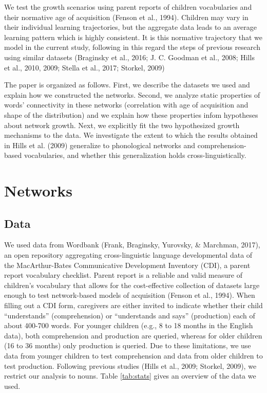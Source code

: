 \documentclass[english,floatsintext,man]{apa6}
\theoremstyle{definition}
\theoremstyle{definition}
\theoremstyle{definition}
\theoremstyle{remark}
\begin{document}
We test the growth scenarios using parent reports of children
vocabularies and their normative age of acquisition (Fenson et al.,
1994). Children may vary in their individual learning trajectories, but
the aggregate data leads to an average learning pattern which is highly
consistent. It is this normative trajectory that we model in the current
study, following in this regard the steps of previous research using
similar datasets (Braginsky et al., 2016; J. C. Goodman et al., 2008;
Hills et al., 2010, 2009; Stella et al., 2017; Storkel, 2009)

The paper is organized as follows. First, we describe the datasets we
used and explain how we constructed the networks. Second, we analyze
static properties of words' connectivity in these networks (correlation
with age of acquisition and shape of the distribution) and we explain
how these properties infom hypotheses about network growth. Next, we
explicitly fit the two hypothesized growth mechanisms to the data. We
investigate the extent to which the results obtained in Hills et al.
(2009) generalize to phonological networks and comprehension-based
vocabularies, and whether this generalization holds
cross-linguistically.

\section{Networks}\label{networks}

\subsection{Data}\label{data}

We used data from Wordbank (Frank, Braginsky, Yurovsky, \& Marchman,
2017), an open repository aggregating cross-linguistic language
developmental data of the MacArthur-Bates Communicative Development
Inventory (CDI), a parent report vocabulary checklist. Parent report is
a reliable and valid measure of children's vocabulary that allows for
the cost-effective collection of datasets large enough to test
network-based models of acquisition (Fenson et al., 1994). When filling
out a CDI form, caregivers are either invited to indicate whether their
child \enquote{understands} (comprehension) or \enquote{understands and
says} (production) each of about 400-700 words. For younger children
(e.g., 8 to 18 months in the English data), both comprehension and
production are queried, whereas for older children (16 to 36 months)
only production is queried. Due to these limitations, we use data from
younger children to test comprehension and data from older children to
test production. Following previous studies (Hills et al., 2009;
Storkel, 2009), we restrict our analysis to nouns. Table \ref{tab:stats}
gives an overview of the data we used.
\end{document}

